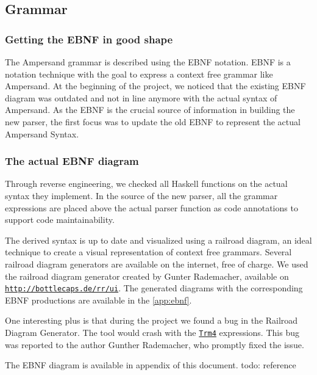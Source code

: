 
\subsection{Grammar}
\label{subsec:analysis-grammar}

\subsubsection{Getting the EBNF in good shape}
%
%
The Ampersand grammar is described using the EBNF notation. 
EBNF is a notation technique with the goal to express a context free grammar like Ampersand.
At the beginning of the project, we noticed that the existing EBNF diagram was outdated and not in line anymore with the actual syntax of Ampersand.
As the EBNF is the crucial source of information in building the new parser, the first focus was to update the old EBNF to represent the actual Ampersand Syntax.

\subsubsection{The actual EBNF diagram}
Through reverse engineering, we checked all Haskell functions on the actual syntax they implement.
In the source of the new parser, all the grammar expressions are placed above the actual parser function as code annotations to support code maintainability.

The derived syntax is up to date and visualized using a railroad diagram, an ideal technique to create a visual representation of context free grammars.
Several railroad diagram generators are available on the internet, free of charge.
We used the railroad diagram generator created by Gunter Rademacher, available on \texttt{\url{http://bottlecaps.de/rr/ui}}.
The generated diagrams with the corresponding EBNF productions are available in the \autoref{app:ebnf}.

One interesting plus is that during the project we found a bug in the Railroad Diagram Generator.
The tool would crash with the \hyperref[fig:ebnf-Trm4]{\texttt{Trm4}} expressions.
This bug was reported to the author Gunther Rademacher, who promptly fixed the issue.

The EBNF diagram is available in appendix of this document. todo: reference
